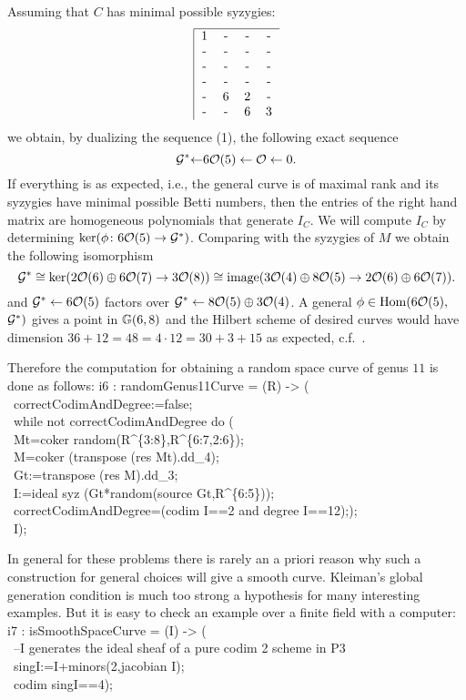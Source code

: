 Assuming that $C$ has minimal possible syzygies:
$$
\begin{tabular}{|cccc}\hline
1 & - & - & - \cr
-&-&-&-\cr
-&-&-&-\cr
-&-&-&-\cr
-&6&2&-\cr
-&-&6&3\cr
\end{tabular}
$$
we obtain, by dualizing the sequence (1), the following exact sequence
$$ {\mathcal G}^* {\leftarrow  } 6{\mathcal O}(5) \leftarrow {\mathcal O} \leftarrow 0.$$
If everything is as expected, 
i.e., the general curve is of maximal rank and its syzygies have minimal possible
Betti numbers, then the entries of the right hand matrix are
homogeneous polynomials that generate $I_C$. 
We will compute $I_C$ by determining $ \ker (\phi \colon 6{\mathcal O}(5) \to {\mathcal G}^*)$.
Comparing with the syzygies of $M$ we obtain the following isomorphism
$${\mathcal G}^* \cong \ker(2{\mathcal O}(6)\oplus6{\mathcal O}(7) \to 3{\mathcal O}(8)) \cong 
{\rm{image}}(3{\mathcal O}(4)\oplus8{\mathcal O}(5) \to 2{\mathcal O}(6)\oplus6{\mathcal O}(7)).$$
and ${\mathcal G}^* \leftarrow 6{\mathcal O}(5)$ factors over ${\mathcal G}^* \leftarrow 8{\mathcal O}(5)\oplus3{\mathcal O}(4)$.
A general $\phi \in \operatorname{Hom}(6{\mathcal O}(5),$ ${\mathcal G}^*)$ gives a point in ${\mathbb G}(6,8)$
and the Hilbert scheme of  desired curves would have dimension 
$36+12=48=4\cdot12=30+3+15$ as expected, c.f.~\cite{CO:Ha2}.

\medskip
Therefore the computation for obtaining a random space curve of genus $11$ 
is done as follows:
\beginOutput
i6 : randomGenus11Curve = (R) -> (\\
\          correctCodimAndDegree:=false;\\
\          while not correctCodimAndDegree do (\\
\               Mt=coker random(R^\{3:8\},R^\{6:7,2:6\});\\
\               M=coker (transpose (res Mt).dd_4);\\
\               Gt:=transpose (res M).dd_3;\\
\               I:=ideal syz (Gt*random(source Gt,R^\{6:5\}));\\
\               correctCodimAndDegree=(codim I==2 and degree I==12););\\
\          I);\\
\endOutput

\medskip
In general for these problems there is rarely an a priori reason
why such a construction for general choices will give a smooth curve. 
Kleiman's global generation condition \cite{CO:Klei} is much too
strong a hypothesis for many interesting examples. 
But it is easy to check an example over a finite field with a computer:
\beginOutput
i7 : isSmoothSpaceCurve = (I) -> (\\
\          --I generates the ideal sheaf of a pure codim 2 scheme in P3\\
\          singI:=I+minors(2,jacobian I);\\
\          codim singI==4);\\
\endOutput

